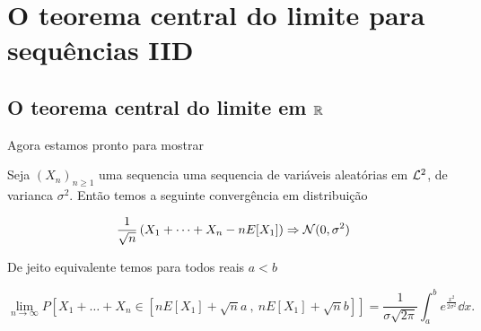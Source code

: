 \section{O teorema central do limite para sequências IID}


\subsection{O teorema central do limite em ${\mathbb R}$}

Agora estamos pronto para mostrar 
\begin{theorem}
 Seja $(X_n)_{n\ge 1}$ uma sequencia uma sequencia de variáveis aleatórias em ${\mathcal L}^2$, de varianca $\sigma^2$.
 Então temos a seguinte convergência em distribuição 
 
 \begin{equation}
  \frac{1}{\sqrt{n}}\left(X_1+\dots+X_n-n E[X_1]\right) \Rightarrow {\ensuremath{\mathcal N}}(0,\sigma^2)
 \end{equation}

 De jeito equivalente temos para todos reais $a<b$ 
 
 \begin{equation}
 \lim_{n\to \infty} P\left[  X_1+\dots+X_n\in [nE[X_1]+\sqrt{n}a \ ,\  nE[X_1]+\sqrt{n}b]\right]=\frac{1}{\sigma \sqrt{2\pi}} \int^b_a e^{\frac{x^2}{2\sigma^2}} \dd x.
 \end{equation}

 
\end{theorem}

